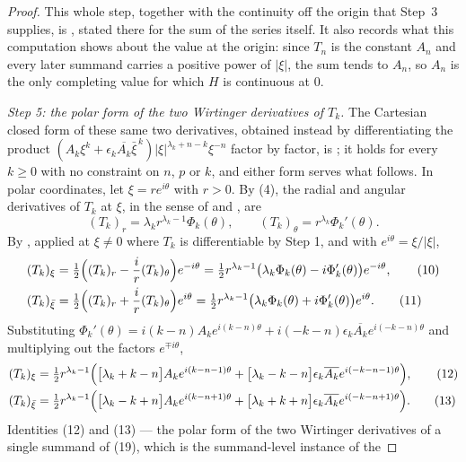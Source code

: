 \begin{proof}
This whole step, together with the continuity off the origin that Step~3
supplies, is , stated there for the sum of
the series itself.  It also records what this computation shows about the
value at the origin: since $T_n$ is the constant $A_n$ and every later summand
carries a positive power of $|\xi|$, the sum tends to $A_n$, so $A_n$ is the
only completing value for which $H$ is continuous at $0$.

\emph{Step 5: the polar form of the two Wirtinger derivatives of $T_k$.}  The
Cartesian closed form of these same two derivatives, obtained instead by
differentiating the product $(A_k\xi^{k}+\epsilon_k\overline{A_k}\bar\xi^{\,k})
|\xi|^{\lambda_k+n-k}\xi^{-n}$ factor by factor, is
; it holds for every $k\ge0$ with no
constraint on $n$, $p$ or $k$, and either form serves what follows.  In polar
coordinates, let
$\xi=re^{i\theta}$ with $r>0$.  By (4), the radial and angular derivatives of
$T_k$ at $\xi$, in the sense of  and , are
\[
  (T_k)_r=\lambda_kr^{\lambda_k-1}\Phi_k(\theta),\qquad
  (T_k)_\theta=r^{\lambda_k}\Phi_k'(\theta).
\]
By , applied at $\xi\neq0$ where $T_k$ is
differentiable by Step 1, and with $e^{i\theta}=\xi/|\xi|$,
\begin{align}
  (T_k)_\xi&=\tfrac12\Bigl((T_k)_r-\frac{i}{r}(T_k)_\theta\Bigr)e^{-i\theta}
  =\tfrac12r^{\lambda_k-1}\bigl(\lambda_k\Phi_k(\theta)-i\Phi_k'(\theta)\bigr)
    e^{-i\theta},\tag{10}\\
  (T_k)_{\bar\xi}&=\tfrac12\Bigl((T_k)_r+\frac{i}{r}(T_k)_\theta\Bigr)e^{i\theta}
  =\tfrac12r^{\lambda_k-1}\bigl(\lambda_k\Phi_k(\theta)+i\Phi_k'(\theta)\bigr)
    e^{i\theta}.\tag{11}
\end{align}
Substituting $\Phi_k'(\theta)=i(k-n)A_ke^{i(k-n)\theta}
+i(-k-n)\epsilon_k\overline{A_k}e^{i(-k-n)\theta}$ and multiplying out the
factors $e^{\mp i\theta}$,
\begin{align}
  (T_k)_\xi&=\tfrac12r^{\lambda_k-1}\Bigl(
    \bigl[\lambda_k+k-n\bigr]A_ke^{i(k-n-1)\theta}
    +\bigl[\lambda_k-k-n\bigr]\epsilon_k\overline{A_k}e^{i(-k-n-1)\theta}\Bigr),
    \tag{12}\\
  (T_k)_{\bar\xi}&=\tfrac12r^{\lambda_k-1}\Bigl(
    \bigl[\lambda_k-k+n\bigr]A_ke^{i(k-n+1)\theta}
    +\bigl[\lambda_k+k+n\bigr]\epsilon_k\overline{A_k}e^{i(-k-n+1)\theta}\Bigr).
    \tag{13}
\end{align}
Identities (12) and (13) --- the polar form of the two Wirtinger derivatives
of a single summand of (19), which is the summand-level instance of the

\end{proof}
